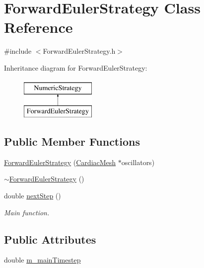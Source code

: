\hypertarget{class_forward_euler_strategy}{\section{Forward\+Euler\+Strategy Class Reference}
\label{class_forward_euler_strategy}
}


{\ttfamily \#include $<$Forward\+Euler\+Strategy.\+h$>$}

Inheritance diagram for Forward\+Euler\+Strategy\+:\begin{figure}[H]
\begin{center}
\leavevmode
\includegraphics[height=2.000000cm]{class_forward_euler_strategy}
\end{center}
\end{figure}
\subsection*{Public Member Functions}
\begin{DoxyCompactItemize}
\item 
\hyperlink{class_forward_euler_strategy_a34072c0f458fb7946733717cf05956a4}{Forward\+Euler\+Strategy} (\hyperlink{class_cardiac_mesh}{Cardiac\+Mesh} $\ast$oscillators)
\item 
\hyperlink{class_forward_euler_strategy_a2c712bdc098b10499d8033b14302526c}{$\sim$\+Forward\+Euler\+Strategy} ()
\item 
double \hyperlink{class_forward_euler_strategy_a3a382585c2d87ffaf370c07c37737a28}{next\+Step} ()
\begin{DoxyCompactList}\small\item\em Main function. \end{DoxyCompactList}\end{DoxyCompactItemize}
\subsection*{Public Attributes}
\begin{DoxyCompactItemize}
\item 
double \hyperlink{class_forward_euler_strategy_aa7cb67aa11fb16d4a76c1944ad3dbbc4}{m\+\_\+main\+Timestep}
\end{DoxyCompactItemize}


